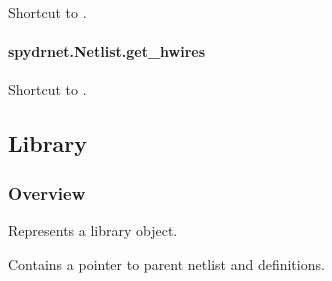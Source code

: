 \documentclass[letterpaper,10pt,english,openany,oneside]{sphinxmanual}
\begin{document}
\begin{fulllineitems}
\label{\detokenize{reference/classes/generated/spydrnet.Netlist.get_hcables:spydrnet.Netlist.get_hcables}}
Shortcut to {\hyperref[\detokenize{reference/classes/generated/spydrnet.get_hcables:spydrnet.get_hcables}]{}}.

\end{fulllineitems}



\paragraph{spydrnet.Netlist.get\_hwires}
\label{\detokenize{reference/classes/generated/spydrnet.Netlist.get_hwires:spydrnet-netlist-get-hwires}}\label{\detokenize{reference/classes/generated/spydrnet.Netlist.get_hwires::doc}}

\begin{fulllineitems}
\label{\detokenize{reference/classes/generated/spydrnet.Netlist.get_hwires:spydrnet.Netlist.get_hwires}}
Shortcut to {\hyperref[\detokenize{reference/classes/generated/spydrnet.get_hwires:spydrnet.get_hwires}]{}}.

\end{fulllineitems}



\subsection{Library}
\label{\detokenize{reference/classes/library:library}}\label{\detokenize{reference/classes/library:id1}}\label{\detokenize{reference/classes/library::doc}}

\subsubsection{Overview}
\label{\detokenize{reference/classes/library:overview}}

\begin{fulllineitems}
\label{\detokenize{reference/classes/library:spydrnet.Library}}
Represents a library object.

Contains a pointer to parent netlist and definitions.

\end{fulllineitems}
\end{document}

